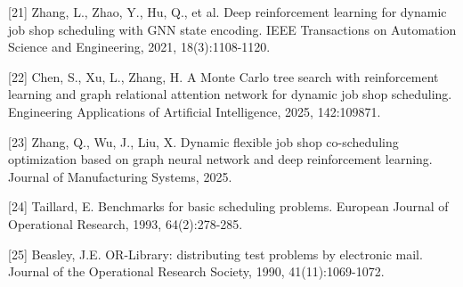 \documentclass{article}
\begin{document}
{[}21{]} Zhang, L., Zhao, Y., Hu, Q., et al. Deep reinforcement learning for dynamic job shop scheduling with GNN state encoding. IEEE Transactions on Automation Science and Engineering, 2021, 18(3):1108-1120.

{[}22{]} Chen, S., Xu, L., Zhang, H. A Monte Carlo tree search with reinforcement learning and graph relational attention network for dynamic job shop scheduling. Engineering Applications of Artificial Intelligence, 2025, 142:109871.

{[}23{]} Zhang, Q., Wu, J., Liu, X. Dynamic flexible job shop co-scheduling optimization based on graph neural network and deep reinforcement learning. Journal of Manufacturing Systems, 2025.

{[}24{]} Taillard, E. Benchmarks for basic scheduling problems. European Journal of Operational Research, 1993, 64(2):278-285.

{[}25{]} Beasley, J.E. OR-Library: distributing test problems by electronic mail. Journal of the Operational Research Society, 1990, 41(11):1069-1072.
\end{document}

